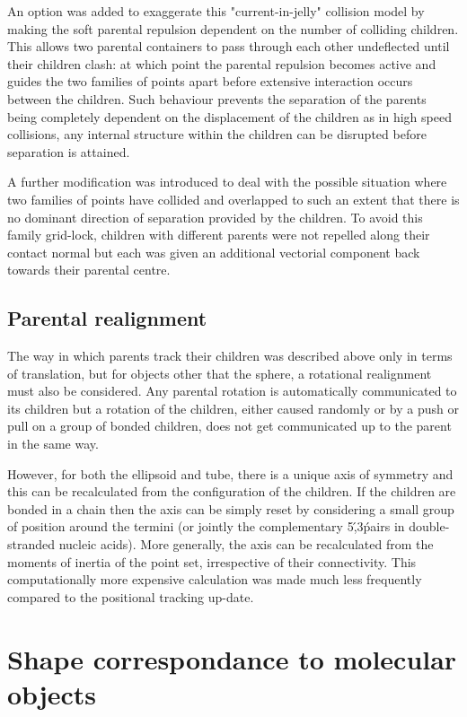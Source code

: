 An option was added to exaggerate this "current-in-jelly" collision model by making
the soft parental repulsion dependent on the number of colliding children.   This
allows two parental containers to pass through each other undeflected until their
children clash: at which point the parental repulsion becomes active and guides the
two families of points apart before extensive interaction occurs between the 
children.   Such behaviour prevents the separation of the parents being completely
dependent on the displacement of the children as in high speed collisions, any
internal structure within the children can be disrupted before separation is attained.

A further modification was introduced to deal with the possible situation where
two families of points have collided and overlapped to such an extent that there is no
dominant direction of separation provided by the children.   To avoid this family
grid-lock, children with different parents were not repelled along their contact
normal but each was given an additional vectorial component back towards their
parental centre.

\subsection{Parental realignment}

The way in which parents track their children was described above only in terms of
translation, but for objects other that the sphere, a rotational realignment must also
be considered.   Any parental rotation is automatically communicated to its children but
a rotation of the children, either caused randomly or by a push or pull on a group of
bonded children, does not get communicated up to the parent in the same way.

However, for both the ellipsoid and tube, there is a unique axis of symmetry and this can
be recalculated from the configuration of the children.  If the children are bonded
in a chain then the axis can be simply reset by considering a small group of position
around the termini (or jointly the complementary 5\',3\' pairs in double-stranded
nucleic acids).   More generally, the axis can be recalculated from the moments
of inertia of the point set, irrespective of their connectivity.
This computationally more expensive calculation was made much less frequently
compared to the positional tracking up-date. 

\section{Shape correspondance to molecular objects}

